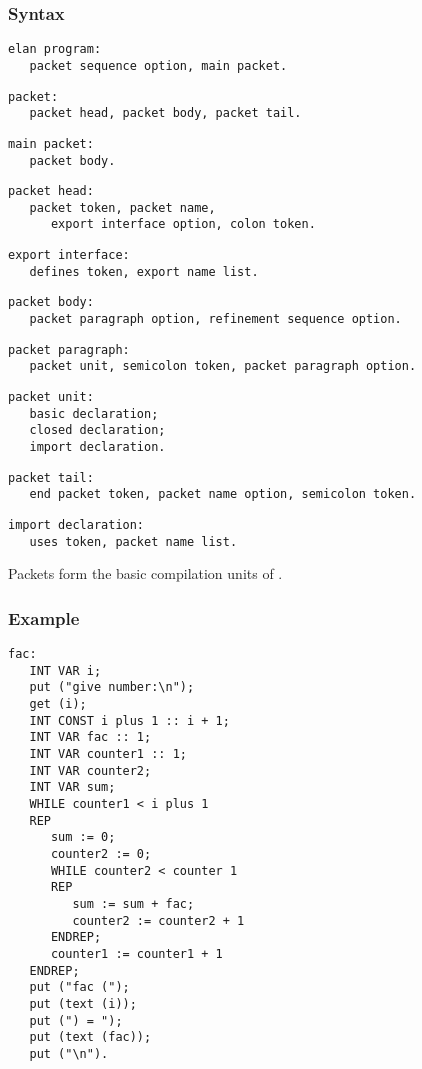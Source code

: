\documentclass [a4paper,12pt,fleqn]{article}
\begin{document}
\subsubsection*{Syntax}
\begin {letterlist}
\item
\begin{verbatim}
elan program:
   packet sequence option, main packet.
\end{verbatim}
\item
\begin{verbatim}
packet:
   packet head, packet body, packet tail.
\end{verbatim}
\item
\begin{verbatim}
main packet:
   packet body.
\end{verbatim}
\item
\begin{verbatim}
packet head:
   packet token, packet name,
      export interface option, colon token.
\end{verbatim}
\item
\begin{verbatim}
export interface:
   defines token, export name list.
\end{verbatim}
\item
\begin{verbatim}
packet body:
   packet paragraph option, refinement sequence option.
\end{verbatim}
\item
\begin{verbatim}
packet paragraph:
   packet unit, semicolon token, packet paragraph option.
\end{verbatim}
\item
\begin{verbatim}
packet unit:
   basic declaration;
   closed declaration;
   import declaration.
\end{verbatim}
\item
\begin{verbatim}
packet tail:
   end packet token, packet name option, semicolon token.
\end{verbatim}
\item
\begin{verbatim}
import declaration:
   uses token, packet name list.
\end{verbatim}
\end{letterlist}
Packets form the basic compilation units of \ELANns.
\subsubsection*{Example}
\begin {verbatim}
fac:
   INT VAR i;
   put ("give number:\n");
   get (i);
   INT CONST i plus 1 :: i + 1;
   INT VAR fac :: 1;
   INT VAR counter1 :: 1;
   INT VAR counter2;
   INT VAR sum;
   WHILE counter1 < i plus 1
   REP
      sum := 0;
      counter2 := 0;
      WHILE counter2 < counter 1
      REP
         sum := sum + fac;
         counter2 := counter2 + 1
      ENDREP;
      counter1 := counter1 + 1
   ENDREP;
   put ("fac (");
   put (text (i));
   put (") = ");
   put (text (fac));
   put ("\n").
\end{verbatim}
\end{document}
